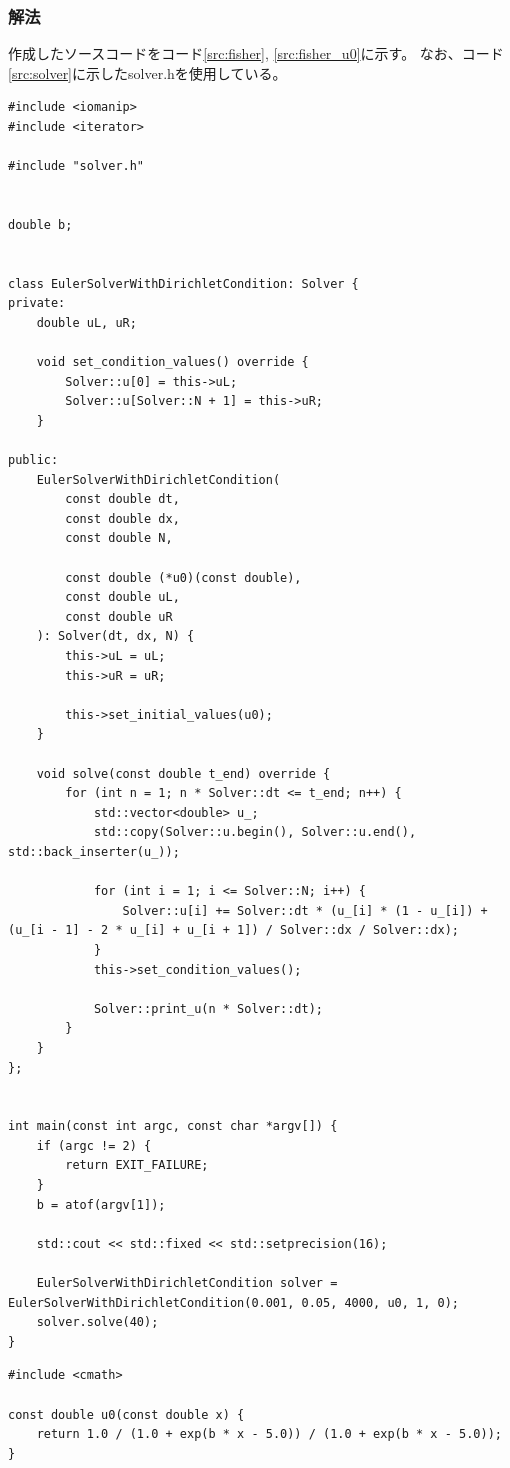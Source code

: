 \documentclass[a4j, titlepage]{jsarticle}
\numberwithin{equation}{section}
\begin{document}
        \subsubsection{解法}
            作成したソースコードをコード\ref{src:fisher}, \ref{src:fisher_u0}に示す。
            なお、コード\ref{src:solver}に示したsolver.hを使用している。
            \begin{lstlisting}[caption=式(\ref{equ:fisher_euler})の実装, label=src:fisher]
#include <iomanip>
#include <iterator>

#include "solver.h"


double b;


class EulerSolverWithDirichletCondition: Solver {
private:
    double uL, uR;

    void set_condition_values() override {
        Solver::u[0] = this->uL;
        Solver::u[Solver::N + 1] = this->uR;
    }

public:
    EulerSolverWithDirichletCondition(
        const double dt,
        const double dx,
        const double N,

        const double (*u0)(const double),
        const double uL,
        const double uR
    ): Solver(dt, dx, N) {
        this->uL = uL;
        this->uR = uR;

        this->set_initial_values(u0);
    }

    void solve(const double t_end) override {
        for (int n = 1; n * Solver::dt <= t_end; n++) {
            std::vector<double> u_;
            std::copy(Solver::u.begin(), Solver::u.end(), std::back_inserter(u_));

            for (int i = 1; i <= Solver::N; i++) {
                Solver::u[i] += Solver::dt * (u_[i] * (1 - u_[i]) + (u_[i - 1] - 2 * u_[i] + u_[i + 1]) / Solver::dx / Solver::dx);
            }
            this->set_condition_values();
            
            Solver::print_u(n * Solver::dt);
        }
    }
};


int main(const int argc, const char *argv[]) {
    if (argc != 2) {
        return EXIT_FAILURE;
    }
    b = atof(argv[1]);
    
    std::cout << std::fixed << std::setprecision(16);

    EulerSolverWithDirichletCondition solver = EulerSolverWithDirichletCondition(0.001, 0.05, 4000, u0, 1, 0);
    solver.solve(40);
}\end{lstlisting}
            \begin{lstlisting}[caption=$u_0(x)$の実装, label=src:fisher_u0]
#include <cmath>

const double u0(const double x) {
    return 1.0 / (1.0 + exp(b * x - 5.0)) / (1.0 + exp(b * x - 5.0));
}\end{lstlisting}
\end{document}
